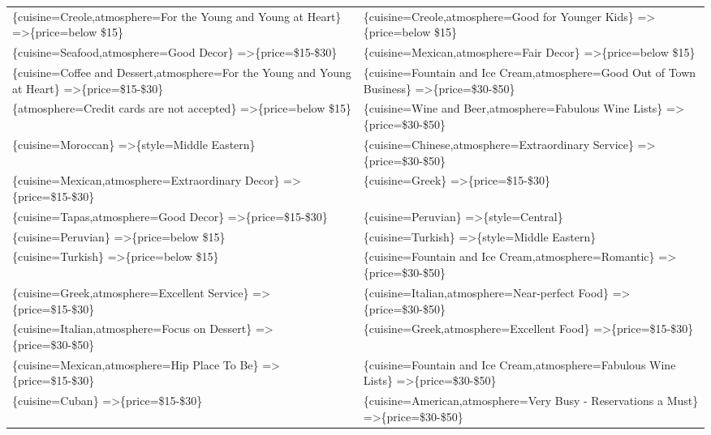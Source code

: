\documentclass[letterpaper,10pt]{article}
\begin{document}
\begin{appendices}
\begin{table}[h]
\begin{adjustbox}{max width=\textwidth}
\begin{tabular}{ll}
\{cuisine=Creole,atmosphere=For the Young and Young at Heart\} =\textgreater \{price=below \$15\} & \{cuisine=Creole,atmosphere=Good for Younger Kids\} =\textgreater \{price=below \$15\} \\
\{cuisine=Seafood,atmosphere=Good Decor\} =\textgreater \{price=\$15-\$30\} & \{cuisine=Mexican,atmosphere=Fair Decor\} =\textgreater \{price=below \$15\} \\
\{cuisine=Coffee and Dessert,atmosphere=For the Young and Young at Heart\} =\textgreater \{price=\$15-\$30\} & \{cuisine=Fountain and Ice Cream,atmosphere=Good Out of Town Business\} =\textgreater \{price=\$30-\$50\} \\
\{atmosphere=Credit cards are not accepted\} =\textgreater \{price=below \$15\} & \{cuisine=Wine and Beer,atmosphere=Fabulous Wine Lists\} =\textgreater \{price=\$30-\$50\} \\
\{cuisine=Moroccan\} =\textgreater \{style=Middle Eastern\} & \{cuisine=Chinese,atmosphere=Extraordinary Service\} =\textgreater \{price=\$30-\$50\} \\
\{cuisine=Mexican,atmosphere=Extraordinary Decor\} =\textgreater \{price=\$15-\$30\} & \{cuisine=Greek\} =\textgreater \{price=\$15-\$30\} \\
\{cuisine=Tapas,atmosphere=Good Decor\} =\textgreater \{price=\$15-\$30\} & \{cuisine=Peruvian\} =\textgreater \{style=Central\} \\
\{cuisine=Peruvian\} =\textgreater \{price=below \$15\} & \{cuisine=Turkish\} =\textgreater \{style=Middle Eastern\} \\
\{cuisine=Turkish\} =\textgreater \{price=below \$15\} & \{cuisine=Fountain and Ice Cream,atmosphere=Romantic\} =\textgreater \{price=\$30-\$50\} \\
\{cuisine=Greek,atmosphere=Excellent Service\} =\textgreater \{price=\$15-\$30\} & \{cuisine=Italian,atmosphere=Near-perfect Food\} =\textgreater \{price=\$30-\$50\} \\
\{cuisine=Italian,atmosphere=Focus on Dessert\} =\textgreater \{price=\$30-\$50\} & \{cuisine=Greek,atmosphere=Excellent Food\} =\textgreater \{price=\$15-\$30\} \\
\{cuisine=Mexican,atmosphere=Hip Place To Be\} =\textgreater \{price=\$15-\$30\} & \{cuisine=Fountain and Ice Cream,atmosphere=Fabulous Wine Lists\} =\textgreater \{price=\$30-\$50\} \\
\{cuisine=Cuban\} =\textgreater \{price=\$15-\$30\} & \{cuisine=American,atmosphere=Very Busy - Reservations a Must\} =\textgreater \{price=\$30-\$50\} \\

\end{tabular}
\end{adjustbox}
\end{table}
\end{appendices}
\end{document}
